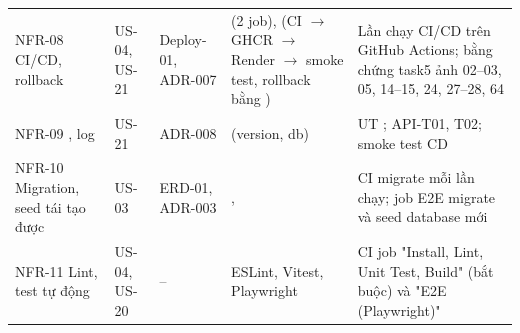 {\begin{longtable}{@{}L{2.4cm}L{1.4cm}L{2cm}L{3.8cm}L{4.3cm}@{}}
NFR-08 CI/CD, rollback & US-04, US-21 & Deploy-01, ADR-007 &  (2 job),  (CI $\rightarrow$ GHCR $\rightarrow$ Render $\rightarrow$ smoke test, rollback bằng ) & Lần chạy CI/CD trên GitHub Actions; bằng chứng task5 ảnh 02--03, 05, 14--15, 24, 27--28, 64 \\
NFR-09 , log & US-21 & ADR-008 &  (version, db) & UT ; API-T01, T02; smoke test CD \\
NFR-10 Migration, seed tái tạo được & US-03 & ERD-01, ADR-003 & ,  & CI migrate mỗi lần chạy; job E2E migrate và seed database mới \\
NFR-11 Lint, test tự động & US-04, US-20 & -- & ESLint, Vitest, Playwright & CI job "Install, Lint, Unit Test, Build" (bắt buộc) và "E2E (Playwright)" \\
\end{longtable}
}